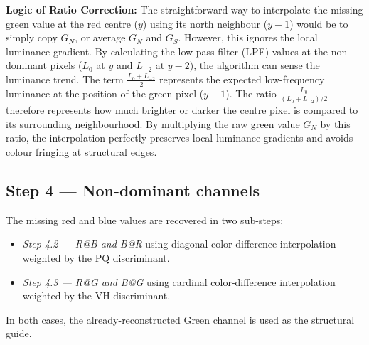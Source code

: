 \documentclass[a4paper,11pt]{article}
\begin{document}
\textbf{Logic of Ratio Correction:} 
The straightforward way to interpolate the missing green value at the red centre ($y$) using its north neighbour ($y-1$) would be to simply copy $G_N$, or average $G_N$ and $G_S$. However, this ignores the local luminance gradient. 
By calculating the low-pass filter (LPF) values at the non-dominant pixels ($L_0$ at $y$ and $L_{-2}$ at $y-2$), the algorithm can sense the luminance trend. The term $\frac{L_0 + L_{-2}}{2}$ represents the expected low-frequency luminance at the position of the green pixel ($y-1$). 
The ratio $\frac{L_0}{(L_0 + L_{-2})/2}$ therefore represents how much brighter or darker the centre pixel is compared to its surrounding neighbourhood. By multiplying the raw green value $G_N$ by this ratio, the interpolation perfectly preserves local luminance gradients and avoids colour fringing at structural edges.

\subsection{Step 4 — Non-dominant channels}
The missing red and blue values are recovered in two sub-steps:
\begin{itemize}
  \item \emph{Step 4.2 — R@B and B@R} using diagonal color-difference interpolation weighted by the PQ discriminant.
  \item \emph{Step 4.3 — R@G and B@G} using cardinal color-difference interpolation weighted by the VH discriminant.
\end{itemize}
In both cases, the already-reconstructed Green channel is used as the structural guide.
\end{document}
